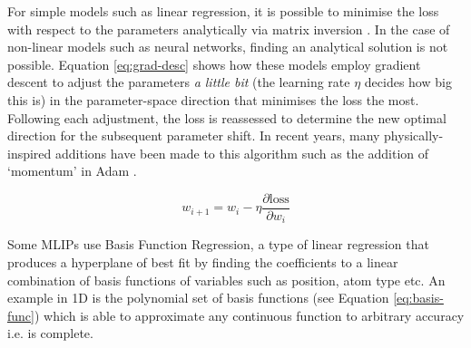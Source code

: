 For simple models such as linear regression, it is possible to minimise the loss with respect to the parameters analytically via matrix inversion \cite{weisstein2002moore}. In the case of non-linear models such as neural networks, finding an analytical solution is not possible. Equation \ref{eq:grad-desc} shows how these models employ gradient descent to adjust the parameters \textit{a little bit} (the learning rate $\eta$ decides how big this is) in the parameter-space direction that minimises the loss the most. Following each adjustment, the loss is reassessed to determine the new optimal direction for the subsequent parameter shift. In recent years, many physically-inspired additions have been made to this algorithm such as the addition of `momentum' in Adam \cite{kingma2014adam}.

\begin{equation} \label{eq:grad-desc}
 w_{i+1} = w_i - \eta \frac{\partial \mathrm{loss}}{\partial w_i}
\end{equation}





Some MLIPs use Basis Function Regression, a type of linear regression that produces a hyperplane of best fit by finding the coefficients to a linear combination of basis functions of variables such as position, atom type etc. An example in 1D is the polynomial set of basis functions (see Equation \ref{eq:basis-func}) which is able to  approximate any continuous function to arbitrary accuracy i.e. is complete.

